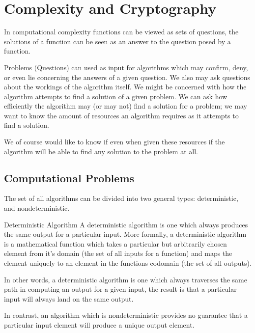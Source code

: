 \section{Complexity and Cryptography}
	
    
    In computational complexity functions can be viewed as sets of questions, the solutions of a function can be seen as an answer to the question posed by a function.


Problems (Questions) can used as input for algorithms which may confirm, deny, or even lie concerning the answers of a given question. We also may ask questions about the workings of the algorithm itself. We might be concerned with how the algorithm attempts to find a solution of a given problem. We can ask how efficiently the algorithm may (or may not) find a solution for a problem; we may want to know the amount of resources an algorithm requires as it attempts to find a solution. 


We of course would like to know if even when given these resources if the algorithm will be able to find any solution to the problem at all. 
    
    
\subsection{Computational Problems}

	


The set of all algorithms can be divided into two general types: deterministic, and nondeterministic. 

\medskip

\begin{defn}{Deterministic Algorithm}
    A deterministic algorithm is one which always produces the same output for a particular input. More formally, a deterministic algorithm is a mathematical function which takes a particular but arbitrarily chosen element from it's domain (the set of all inputs for a function) and maps the element uniquely to an element in the functions codomain (the set of all outputs).
\end{defn}
\medskip

In other words, a deterministic algorithm is one which always traverses the same path in computing an output for a given input, the result is that a particular input will always land on the same output.
\medskip

In contrast, an algorithm which is nondeterministic provides no guarantee that a particular input element will produce a unique output element. 


